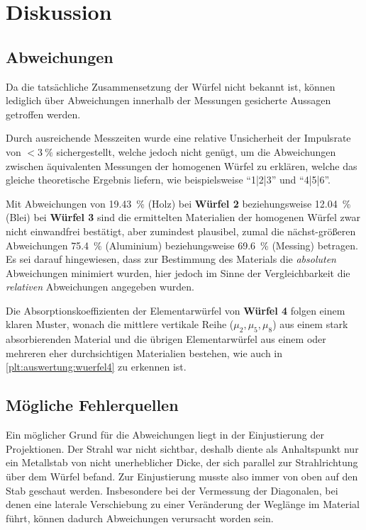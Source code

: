 \section{Diskussion}
\label{sec:diskussion}

\subsection{Abweichungen}
    Da die tatsächliche Zusammensetzung der Würfel nicht bekannt ist,
    können lediglich über Abweichungen innerhalb der Messungen gesicherte Aussagen getroffen werden.

    Durch ausreichende Messzeiten wurde
    eine relative Unsicherheit der Impulsrate von $< \SI{3}{\percent}$ sichergestellt,
    welche jedoch nicht genügt,
    um die Abweichungen zwischen äquivalenten Messungen der homogenen Würfel zu erklären,
    welche das gleiche theoretische Ergebnis liefern,
    wie beispielsweise \enquote{1|2|3} und \enquote{4|5|6}.

    Mit Abweichungen von
    \SI{19.43}{\percent} (Holz) bei \textbf{Würfel 2} beziehungsweise
    \SI{12.04}{\percent} (Blei) bei \textbf{Würfel 3}
    sind die ermittelten Materialien der homogenen Würfel zwar nicht einwandfrei bestätigt,
    aber zumindest plausibel,
    zumal die nächst-größeren Abweichungen
    \SI{75.4}{\percent} (Aluminium) beziehungsweise
    \SI{69.6}{\percent} (Messing)
    betragen.
    Es sei darauf hingewiesen, dass zur Bestimmung des Materials die \emph{absoluten} Abweichungen minimiert wurden,
    hier jedoch im Sinne der Vergleichbarkeit die \emph{relativen} Abweichungen angegeben wurden.

    Die Absorptionskoeffizienten der Elementarwürfel von \textbf{Würfel 4} folgen einem klaren Muster,
    wonach die mittlere vertikale Reihe ($\mu_2, \mu_5, \mu_8$) aus einem stark absorbierenden Material
    und die übrigen Elementarwürfel aus einem oder mehreren eher durchsichtigen Materialien bestehen,
    wie auch in \autoref{plt:auswertung:wuerfel4} zu erkennen ist.


\subsection{Mögliche Fehlerquellen}

    Ein möglicher Grund für die Abweichungen liegt in der Einjustierung der Projektionen.
    Der Strahl war nicht sichtbar,
    deshalb diente als Anhaltspunkt nur ein Metallstab von nicht unerheblicher Dicke,
    der sich parallel zur Strahlrichtung über dem Würfel befand.
    Zur Einjustierung musste also immer von oben auf den Stab geschaut werden.
    Insbesondere bei der Vermessung der Diagonalen,
    bei denen eine laterale Verschiebung zu einer Veränderung der Weglänge im Material führt,
    können dadurch Abweichungen verursacht worden sein.

